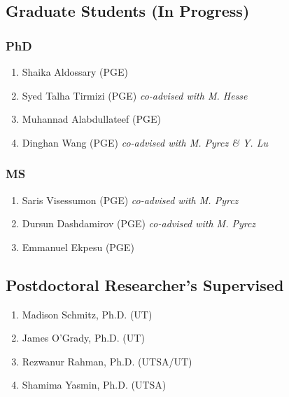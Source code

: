 \subsection*{Graduate Students (In Progress)}



\subsubsection*{PhD}
\begin{enumerate}
    \item Shaika Aldossary (PGE) 
    \item Syed Talha Tirmizi (PGE)  \emph{co-advised with M. Hesse}
    \item Muhannad Alabdullateef (PGE)
    \item Dinghan Wang (PGE) \emph{co-advised with M. Pyrcz \& Y. Lu}
\end{enumerate}

\subsubsection*{MS}
\begin{enumerate}
    \item Saris Visessumon (PGE) \emph{co-advised with M. Pyrcz}
    \item Dursun Dashdamirov (PGE) \emph{co-advised with M. Pyrcz}
    \item Emmanuel Ekpesu (PGE) 
\end{enumerate}

\subsection*{Postdoctoral Researcher's Supervised}
  \begin{enumerate}
      \item Madison Schmitz, Ph.D. (UT)
      \item James O'Grady, Ph.D. (UT)
      \item Rezwanur Rahman, Ph.D. (UTSA/UT)
      \item Shamima Yasmin, Ph.D. (UTSA)
  \end{enumerate}

